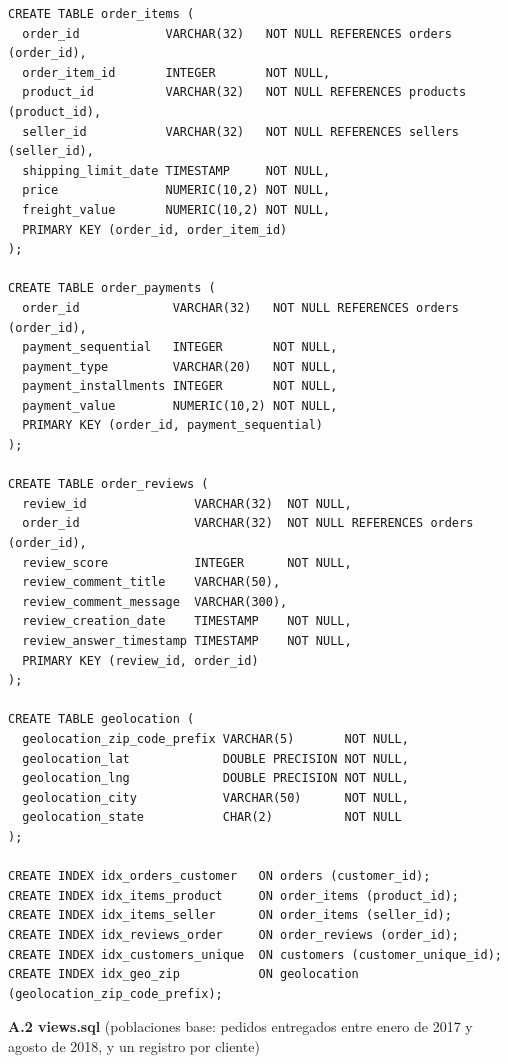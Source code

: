 \documentclass[a4paper,stu,12pt,donotrepeattitle,floatsintext]{apa7}
\begin{document}
\begin{lstlisting}
CREATE TABLE order_items (
  order_id            VARCHAR(32)   NOT NULL REFERENCES orders (order_id),
  order_item_id       INTEGER       NOT NULL,
  product_id          VARCHAR(32)   NOT NULL REFERENCES products (product_id),
  seller_id           VARCHAR(32)   NOT NULL REFERENCES sellers (seller_id),
  shipping_limit_date TIMESTAMP     NOT NULL,
  price               NUMERIC(10,2) NOT NULL,
  freight_value       NUMERIC(10,2) NOT NULL,
  PRIMARY KEY (order_id, order_item_id)
);

CREATE TABLE order_payments (
  order_id             VARCHAR(32)   NOT NULL REFERENCES orders (order_id),
  payment_sequential   INTEGER       NOT NULL,
  payment_type         VARCHAR(20)   NOT NULL,
  payment_installments INTEGER       NOT NULL,
  payment_value        NUMERIC(10,2) NOT NULL,
  PRIMARY KEY (order_id, payment_sequential)
);

CREATE TABLE order_reviews (
  review_id               VARCHAR(32)  NOT NULL,
  order_id                VARCHAR(32)  NOT NULL REFERENCES orders (order_id),
  review_score            INTEGER      NOT NULL,
  review_comment_title    VARCHAR(50),
  review_comment_message  VARCHAR(300),
  review_creation_date    TIMESTAMP    NOT NULL,
  review_answer_timestamp TIMESTAMP    NOT NULL,
  PRIMARY KEY (review_id, order_id)
);

CREATE TABLE geolocation (
  geolocation_zip_code_prefix VARCHAR(5)       NOT NULL,
  geolocation_lat             DOUBLE PRECISION NOT NULL,
  geolocation_lng             DOUBLE PRECISION NOT NULL,
  geolocation_city            VARCHAR(50)      NOT NULL,
  geolocation_state           CHAR(2)          NOT NULL
);

CREATE INDEX idx_orders_customer   ON orders (customer_id);
CREATE INDEX idx_items_product     ON order_items (product_id);
CREATE INDEX idx_items_seller      ON order_items (seller_id);
CREATE INDEX idx_reviews_order     ON order_reviews (order_id);
CREATE INDEX idx_customers_unique  ON customers (customer_unique_id);
CREATE INDEX idx_geo_zip           ON geolocation (geolocation_zip_code_prefix);
\end{lstlisting}
\textbf{A.2 views.sql} (poblaciones base: pedidos entregados entre enero de 2017 y agosto de 2018, y un registro por cliente)
\end{document}
